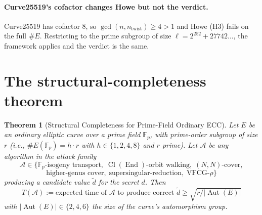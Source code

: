 \documentclass[11pt,a4paper]{article}
\newtheorem{theorem}{Theorem}[section]
\theoremstyle{definition}
\newcommand{\FF}{\mathbb{F}}
\newcommand{\End}{\operatorname{End}}
\newcommand{\Aut}{\operatorname{Aut}}
\newcommand{\Cl}{\operatorname{Cl}}
\renewcommand{\gcd}{\operatorname{gcd}}
\begin{document}
\paragraph{Curve25519's cofactor changes Howe but not the verdict.}
Curve25519 has cofactor 8, so $\gcd(n, n_{\text{twist}}) \geq 4 > 1$
and Howe (H3) fails on the full $\#E$. Restricting to the prime
subgroup of size $\ell = 2^{252} + 27742\ldots$, the framework
applies and the verdict is the same.

\section{The structural-completeness theorem}\label{sec:theorem}

\begin{theorem}[Structural Completeness for Prime-Field Ordinary ECC]
\label{thm:main}
Let $E$ be an ordinary elliptic curve over a prime field $\FF_p$,
with prime-order subgroup of size $r$ (i.e., $\#E(\FF_p) = h \cdot r$
with $h \in \{1, 2, 4, 8\}$ and $r$ prime). Let $\mathcal{A}$ be any
algorithm in the attack family
\[
   \mathcal{A} \in \{\text{$\FF_p$-isogeny transport},\;
                    \Cl(\End)\text{-orbit walking},\;
                    (N,N)\text{-cover},
\]\[
                    \text{higher-genus cover},\;
                    \text{supersingular-reduction},\;
                    \text{VFCG-}\rho\}
\]
producing a candidate value $\tilde d$ for the secret $d$. Then
\[
   T(\mathcal{A}) := \text{expected time of $\mathcal{A}$ to produce
                          correct $\tilde d$}
   \geq \sqrt{r / |\Aut(E)|}
\]
with $|\Aut(E)| \in \{2, 4, 6\}$ the size of the curve's
automorphism group.
\end{theorem}
\end{document}
